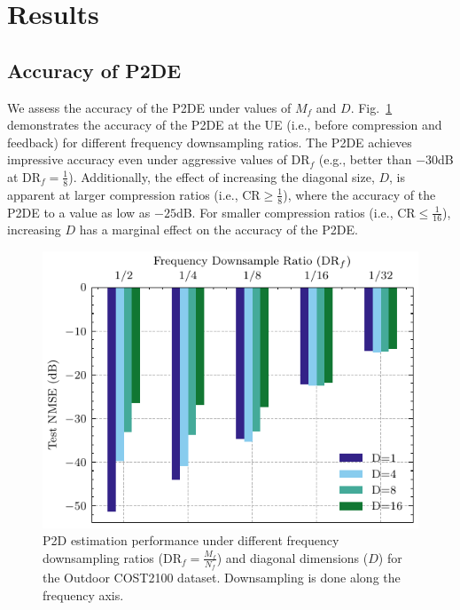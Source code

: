 \section{Results}
\label{sect:p2de-results}

\subsection{Accuracy of P2DE}

 We assess the accuracy of the P2DE under values of $M_f$ and $D$. Fig.~\ref{fig:outdoor_p2d_init} demonstrates the accuracy of the P2DE at the UE (i.e., before compression and feedback) for different frequency downsampling ratios. The P2DE achieves impressive accuracy even under aggressive values of $\text{DR}_f$ (e.g., better than $-30$dB at $\text{DR}_f=\frac 18$). Additionally, the effect of increasing the diagonal size, $D$, is apparent at larger compression ratios (i.e., $\text{CR} \geq \frac 18$), where the accuracy of the P2DE to a value as low as $-25$dB. For smaller compression ratios (i.e., $\text{CR} \leq \frac {1}{16}$), increasing $D$ has a marginal effect on the accuracy of the P2DE.

 \begin{figure}[!hbtp]
    \centering
    \includegraphics{./images/outdoor_p2d_diag.pdf}
    \caption{P2D estimation performance under different frequency downsampling ratios ($\text{DR}_f=\frac{M_f}{N_f}$) and diagonal dimensions ($D$) for the Outdoor COST2100 dataset. Downsampling is done along the frequency axis.}
    \label{fig:outdoor_p2d_init}
\end{figure}

